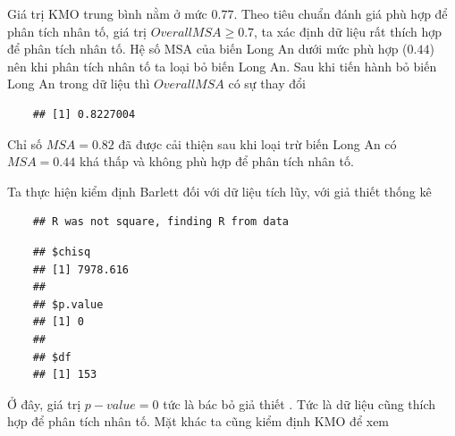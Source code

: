 \documentclass[../thesis.tex]{subfiles}
\begin{document}
Giá trị KMO trung bình nằm ở mức $ 0.77 $. Theo tiêu chuẩn đánh giá phù hợp để phân tích nhân tố, giá trị $ Overall MSA \geq 0.7 $, ta xác định dữ liệu rất thích hợp để phân tích nhân tố. Hệ số MSA của biến Long An dưới mức phù hợp ($ 0.44 $) nên khi phân tích nhân tố ta loại bỏ biến Long An. Sau khi tiến hành bỏ biến Long An trong dữ liệu thì $ Overall MSA $ có sự thay đổi

\begin{Shaded}
	\begin{Highlighting}[]
\SpecialCharTok{\%\textgreater{}\%} \SpecialCharTok{{-}}\SpecialCharTok{\%\textgreater{}\%} 
\NormalTok{() }\SpecialCharTok{\%\textgreater{}\%}\SpecialCharTok{\$}
	\end{Highlighting}
\end{Shaded}

\begin{verbatim}
	## [1] 0.8227004
\end{verbatim}

Chỉ số $ MSA = 0.82 $ đã được cải thiện sau khi loại trừ biến Long An có $ MSA = 0.44 $ khá thấp và không phù hợp để phân tích nhân tố.


\newpage
Ta thực hiện kiểm định Barlett đối với dữ liệu tích lũy, với giả thiết thống kê 
\begin{Shaded}
	\begin{Highlighting}[]
\SpecialCharTok{\%\textgreater{}\%}\SpecialCharTok{::}\NormalTok{()}
	\end{Highlighting}
\end{Shaded}

\begin{verbatim}
	## R was not square, finding R from data
\end{verbatim}

\begin{verbatim}
	## $chisq
	## [1] 7978.616
	## 
	## $p.value
	## [1] 0
	## 
	## $df
	## [1] 153
\end{verbatim}


Ở đây, giá trị $ p-value = 0 $ tức là bác bỏ giả thiết . Tức là dữ liệu cũng thích hợp để phân tích nhân tố. Mặt khác ta cũng kiểm định KMO để xem

\begin{Shaded}
	\begin{Highlighting}[]
\SpecialCharTok{\%\textgreater{}\%}\SpecialCharTok{::}\NormalTok{()}
	\end{Highlighting}
\end{Shaded}
\end{document}
